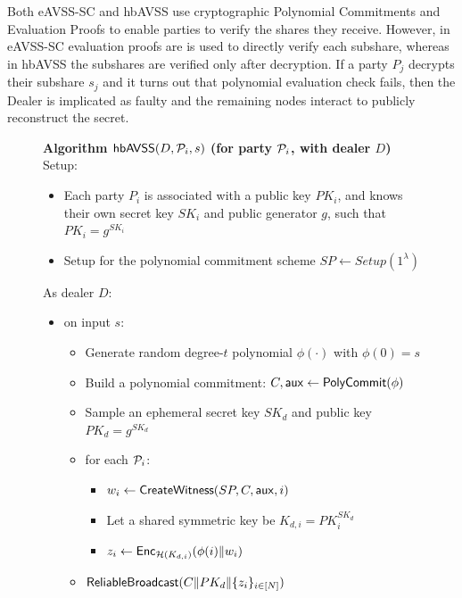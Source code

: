 \documentclass{sig-alternate-05-2015}
\begin{document}
Both eAVSS-SC and hbAVSS use cryptographic Polynomial Commitments and Evaluation Proofs to enable parties to verify the shares they receive. However, in eAVSS-SC evaluation proofs are is used to directly verify each subshare, whereas in hbAVSS the subshares are verified only after decryption. If a party $P_j$ decrypts their subshare $s_j$ and it turns out that polynomial evaluation check fails, then the Dealer is implicated as faulty and the remaining nodes interact to publicly reconstruct the secret.


\begin{figure}
  \vspace{10pt}
\begin{boxedminipage}{\columnwidth}
  {\centering \textbf{Algorithm $\msf{hbAVSS}(D, {\P_i}, s)$ (for party $\P_i$, with dealer $D$)} \\}
  Setup:
\begin{itemize}
\item Each party $P_i$ is associated with a public key $PK_i$, and knows their own secret key $SK_i$ and public generator $g$, such that $PK_i = g^{SK_i}$
\item Setup for the polynomial commitment scheme $SP \leftarrow Setup(1^\lambda)$
\end{itemize}
As dealer $D$:
\begin{itemize}
\item on input $s$:
  \begin{itemize}
  \item Generate random degree-$t$ polynomial $\phi(\cdot)$ with $\phi(0) = s$
  \item Build a polynomial commitment: $C,\msf{aux} \leftarrow \msf{PolyCommit}( \phi )$
  \item Sample an ephemeral secret key \(SK_{d}\) and public key \(PK_{d} = g^{SK_{d}}\)
  \item for each $\P_i$:
    \begin{itemize}
    \item $w_i \leftarrow \msf{CreateWitness}(SP, C, \msf{aux}, i)$
    \item Let a shared symmetric key be $ K_{d,i} = PK_{i}^{SK_{d}} $
    \item $z_i \leftarrow \msf{Enc}_{\hash(K_{d,i})}( \phi(i) \| w_i )$
    \end{itemize}
  \item $\msf{ReliableBroadcast}( C \| PK_d \| \{z_i\}_{i \in [N]} )$
  \end{itemize}
\end{itemize}


\end{boxedminipage}
\end{figure}
\end{document}
